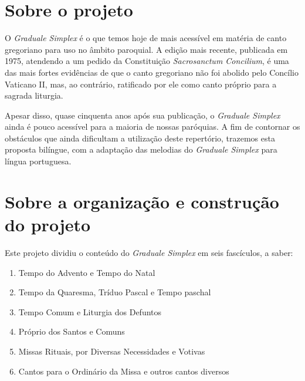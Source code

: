 \newcommand{\GR}{\emph{Graduale Romanum}}
\newcommand{\GS}{\emph{Graduale Simplex}}
\newcommand{\KS}{\emph{Kyriale Simplex}}
\newcommand{\Al}{\emph{Allelúia}}
\newcommand{\Schola}{\emph{schola}}
\newcommand{\ScholaC}{\emph{schola cantorum}}
\newcommand{\FirstPara}[1]{\noindent\textcolor{gregoriocolor}{#1.}}
\newcommand{\Para}[1]{\vspace{\baselineskip}\noindent\textcolor{gregoriocolor}{#1.}}


\section*{Sobre o projeto}

O {\GS} é o que temos hoje de mais acessível em matéria de canto gregoriano para uso no âmbito paroquial. A edição mais recente, publicada em 1975, atendendo a um pedido da Constituição \emph{Sacrosanctum Concilium}, é uma das mais fortes evidências de que o canto gregoriano não foi abolido pelo Concílio Vaticano II, mas, ao contrário, ratificado por ele como canto próprio para a sagrada liturgia.

Apesar disso, quase cinquenta anos após sua publicação, o {\GS} ainda é pouco acessível para a maioria de nossas paróquias. A fim de contornar os obstáculos que ainda dificultam a utilização deste repertório, trazemos esta proposta bilíngue, com a adaptação das melodias do {\GS} para língua portuguesa.

\section*{Sobre a organização e construção do projeto}

Este projeto dividiu o conteúdo do {\GS} em seis fascículos, a saber:
\begin{enumerate}[I:]
  \item Tempo do Advento e Tempo do Natal
  \item Tempo da Quaresma, Tríduo Pascal e Tempo paschal
  \item Tempo Comum e Liturgia dos Defuntos
  \item Próprio dos Santos e Comuns
  \item Missas Rituais, por Diversas Necessidades e Votivas
  \item Cantos para o Ordinário da Missa e outros cantos diversos
\end{enumerate}

